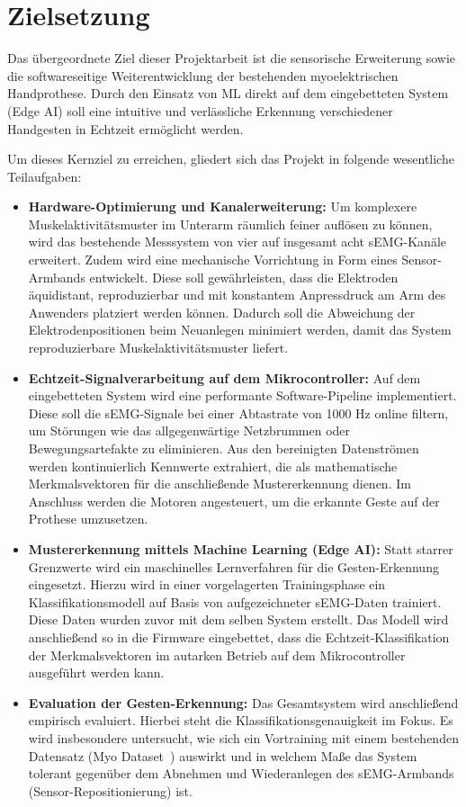 \section{Zielsetzung}
\label{sec:zielsetzung}
Das übergeordnete Ziel dieser Projektarbeit ist die sensorische Erweiterung sowie die softwareseitige Weiterentwicklung der bestehenden myoelektrischen Handprothese. Durch den Einsatz von \ac{ML} direkt auf dem eingebetteten System (Edge AI) soll eine intuitive und verlässliche Erkennung verschiedener Handgesten in Echtzeit ermöglicht werden.

Um dieses Kernziel zu erreichen, gliedert sich das Projekt in folgende wesentliche Teilaufgaben:
\begin{itemize}
    \item \textbf{Hardware-Optimierung und Kanalerweiterung:} Um komplexere Muskelaktivitätsmuster im Unterarm räumlich feiner auflösen zu können, wird das bestehende Messsystem von vier auf insgesamt acht \ac{sEMG}-Kanäle erweitert. Zudem wird eine mechanische Vorrichtung in Form eines Sensor-Armbands entwickelt. Diese soll gewährleisten, dass die Elektroden äquidistant, reproduzierbar und mit konstantem Anpressdruck am Arm des Anwenders platziert werden können. Dadurch soll die Abweichung der Elektrodenpositionen beim Neuanlegen minimiert werden, damit das System reproduzierbare Muskelaktivitätsmuster liefert. 
    \item \textbf{Echtzeit-Signalverarbeitung auf dem Mikrocontroller:} Auf dem eingebetteten System wird eine performante Software-Pipeline implementiert. Diese soll die \ac{sEMG}-Signale bei einer Abtastrate von 1000 Hz online filtern, um Störungen wie das allgegenwärtige Netzbrummen oder Bewegungsartefakte zu eliminieren. Aus den bereinigten Datenströmen werden kontinuierlich Kennwerte extrahiert, die als mathematische Merkmalsvektoren für die anschließende Mustererkennung dienen. Im Anschluss werden die Motoren angesteuert, um die erkannte Geste auf der Prothese umzusetzen.
    \item \textbf{Mustererkennung mittels Machine Learning (Edge AI):} Statt starrer Grenzwerte wird ein maschinelles Lernverfahren für die Gesten-Erkennung eingesetzt. Hierzu wird in einer vorgelagerten Trainingsphase ein Klassifikationsmodell auf Basis von aufgezeichneter \ac{sEMG}-Daten trainiert. Diese Daten wurden zuvor mit dem selben System erstellt. Das Modell wird anschließend so in die Firmware eingebettet, dass die Echtzeit-Klassifikation der Merkmalsvektoren im autarken Betrieb auf dem Mikrocontroller ausgeführt werden kann.
    \item \textbf{Evaluation der Gesten-Erkennung:} Das Gesamtsystem wird anschließend empirisch evaluiert. Hierbei steht die Klassifikationsgenauigkeit im Fokus. Es wird insbesondere untersucht, wie sich ein Vortraining mit einem bestehenden Datensatz (Myo Dataset~\cite{myo_dataset}) auswirkt und in welchem Maße das System tolerant gegenüber dem Abnehmen und Wiederanlegen des \ac{sEMG}-Armbands (Sensor-Repositionierung) ist.
\end{itemize}
